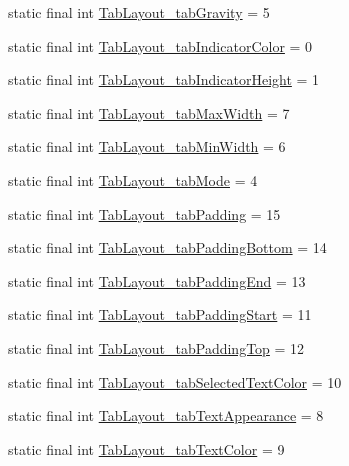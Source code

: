 \begin{DoxyCompactItemize}
\item 
static final int \hyperlink{classproject4_1_1xaria_1_1R_1_1styleable_a8c418d804b5e15d65312566231ca7340}{Tab\+Layout\+\_\+tab\+Gravity} = 5
\item 
static final int \hyperlink{classproject4_1_1xaria_1_1R_1_1styleable_a87c9501d7b9b1c4efdf9fd753a3b2a07}{Tab\+Layout\+\_\+tab\+Indicator\+Color} = 0
\item 
static final int \hyperlink{classproject4_1_1xaria_1_1R_1_1styleable_aef58cd9fb4e80a28f816ba0af7d84799}{Tab\+Layout\+\_\+tab\+Indicator\+Height} = 1
\item 
static final int \hyperlink{classproject4_1_1xaria_1_1R_1_1styleable_a98754c74e515696696a25d422e921ca4}{Tab\+Layout\+\_\+tab\+Max\+Width} = 7
\item 
static final int \hyperlink{classproject4_1_1xaria_1_1R_1_1styleable_a1999d406b522edbecdcd457eab2b11c7}{Tab\+Layout\+\_\+tab\+Min\+Width} = 6
\item 
static final int \hyperlink{classproject4_1_1xaria_1_1R_1_1styleable_afcef95dafaf4ae2b599ba4d8353ffddf}{Tab\+Layout\+\_\+tab\+Mode} = 4
\item 
static final int \hyperlink{classproject4_1_1xaria_1_1R_1_1styleable_ac7d60eaa3c996af7b321340db6e3a4f5}{Tab\+Layout\+\_\+tab\+Padding} = 15
\item 
static final int \hyperlink{classproject4_1_1xaria_1_1R_1_1styleable_a0482d61a95e5a8235145359e07653b15}{Tab\+Layout\+\_\+tab\+Padding\+Bottom} = 14
\item 
static final int \hyperlink{classproject4_1_1xaria_1_1R_1_1styleable_a5e2194c0ed2bb35846788cfeed3fcb22}{Tab\+Layout\+\_\+tab\+Padding\+End} = 13
\item 
static final int \hyperlink{classproject4_1_1xaria_1_1R_1_1styleable_a14c5feee7b7d3f34cae3fc0247483fb2}{Tab\+Layout\+\_\+tab\+Padding\+Start} = 11
\item 
static final int \hyperlink{classproject4_1_1xaria_1_1R_1_1styleable_a5041e5aa45eb71245d2c71dd376b1471}{Tab\+Layout\+\_\+tab\+Padding\+Top} = 12
\item 
static final int \hyperlink{classproject4_1_1xaria_1_1R_1_1styleable_a6712e8d9a5755a29fa64dfcc525d7652}{Tab\+Layout\+\_\+tab\+Selected\+Text\+Color} = 10
\item 
static final int \hyperlink{classproject4_1_1xaria_1_1R_1_1styleable_a053cc43fb27e9cdefa49d30126adbbc7}{Tab\+Layout\+\_\+tab\+Text\+Appearance} = 8
\item 
static final int \hyperlink{classproject4_1_1xaria_1_1R_1_1styleable_ae3d2d69da095e365fb2c36ae299f0100}{Tab\+Layout\+\_\+tab\+Text\+Color} = 9

\end{DoxyCompactItemize}
